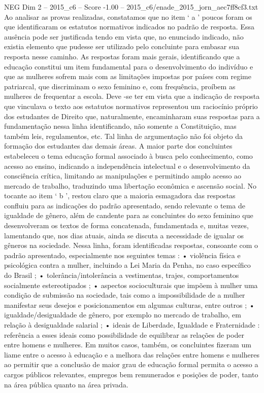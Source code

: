 \begin{textsample}{NEG Dim 2 – 2015\_c6 – Score -1.00 – 2015\_c6/enade\_2015\_jorn\_aec7ff8cf3.txt}
Ao analisar as provas realizadas, constatamos que no item ‘ a ’ poucos foram os que identificaram os estatutos normativos indicados no padrão de resposta.
Essa ausência pode ser justificada tendo em vista que, no enunciado indicado, não existia elemento que pudesse ser utilizado pelo concluinte para embasar sua resposta nesse caminho.
As respostas foram mais gerais, identificando que a educação constitui um item fundamental para o desenvolvimento do indivíduo e que as mulheres sofrem mais com as limitações impostas por países com regime patriarcal, que discriminam o sexo feminino e, com frequência, proíbem as mulheres de frequentar a escola.
Deve -se ter em vista que a indicação de resposta que vinculava o texto aos estatutos normativos representou um raciocínio próprio dos estudantes de Direito que, naturalmente, encaminharam suas respostas para a fundamentação nessa linha identificando, não somente a Constituição, mas também leis, regulamentos, etc.
Tal linha de argumentação não foi objeto da formação dos estudantes das demais áreas.
A maior parte dos concluintes estabeleceu o tema educação formal associado à busca pelo conhecimento, como acesso ao ensino, indicando a independência intelectual e o desenvolvimento da consciência crítica, limitando as manipulações e permitindo amplo acesso ao mercado de trabalho, traduzindo uma libertação econômica e ascensão social.
No tocante ao item ‘ b ’, restou claro que a maioria esmagadora das respostas confluiu para as indicações do padrão apresentado, sendo relevante o tema de igualdade de gênero, além de candente para as concluintes do sexo feminino que desenvolveram os textos de forma concatenada, fundamentada e, muitas vezes, lamentando que, nos dias atuais, ainda se discuta a necessidade de igualar os gêneros na sociedade.
Nessa linha, foram identificadas respostas, consoante com o padrão apresentado, especialmente nos seguintes temas : • violência física e psicológica contra a mulher, incluindo a Lei Maria da Penha, no caso específico do Brasil ; • tolerância/intolerância a vestimentas, trajes, comportamentos socialmente estereotipados ; • aspectos socioculturais que impõem à mulher uma condição de submissão na sociedade, tais como a impossibilidade de a mulher manifestar seus desejos e posicionamentos em algumas culturas, entre outros ; • igualdade/desigualdade de gênero, por exemplo no mercado de trabalho, em relação à desigualdade salarial ; • ideais de Liberdade, Igualdade e Fraternidade : referência a esses ideais como possibilidade de equilibrar as relações de poder entre homens e mulheres.
Em muitos casos, também, os concluintes fizeram um liame entre o acesso à educação e a melhora das relações entre homens e mulheres ao permitir que a conclusão de maior grau de educação formal permita o acesso a cargos públicos relevantes, empregos bem remunerados e posições de poder, tanto na área pública quanto na área privada.

\end{textsample}
